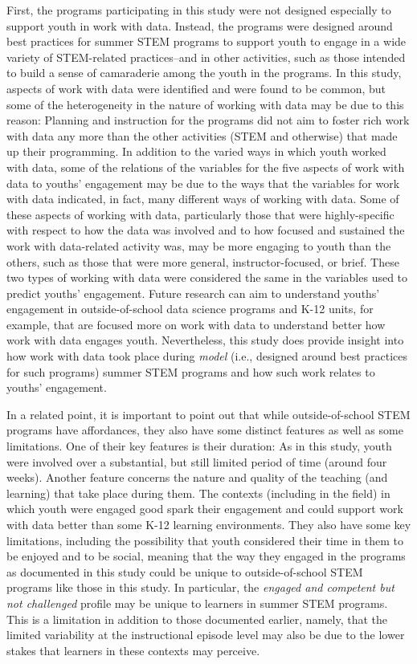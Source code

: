 \documentclass[]{msu-thesis}
\theoremstyle{definition}
\theoremstyle{definition}
\theoremstyle{definition}
\theoremstyle{remark}
\begin{document}
First, the programs participating in this study were not designed
especially to support youth in work with data. Instead, the programs
were designed around best practices for summer STEM programs to support
youth to engage in a wide variety of STEM-related practices--and in
other activities, such as those intended to build a sense of camaraderie
among the youth in the programs. In this study, aspects of work with
data were identified and were found to be common, but some of the
heterogeneity in the nature of working with data may be due to this
reason: Planning and instruction for the programs did not aim to foster
rich work with data any more than the other activities (STEM and
otherwise) that made up their programming. In addition to the varied
ways in which youth worked with data, some of the relations of the
variables for the five aspects of work with data to youths' engagement
may be due to the ways that the variables for work with data indicated,
in fact, many different ways of working with data. Some of these aspects
of working with data, particularly those that were highly-specific with
respect to how the data was involved and to how focused and sustained
the work with data-related activity was, may be more engaging to youth
than the others, such as those that were more general,
instructor-focused, or brief. These two types of working with data were
considered the same in the variables used to predict youths' engagement.
Future research can aim to understand youths' engagement in
outside-of-school data science programs and K-12 units, for example,
that are focused more on work with data to understand better how work
with data engages youth. Nevertheless, this study does provide insight
into how work with data took place during \emph{model} (i.e., designed
around best practices for such programs) summer STEM programs and how
such work relates to youths' engagement.

In a related point, it is important to point out that while
outside-of-school STEM programs have affordances, they also have some
distinct features as well as some limitations. One of their key features
is their duration: As in this study, youth were involved over a
substantial, but still limited period of time (around four weeks).
Another feature concerns the nature and quality of the teaching (and
learning) that take place during them. The contexts (including in the
field) in which youth were engaged good spark their engagement and could
support work with data better than some K-12 learning environments. They
also have some key limitations, including the possibility that youth
considered their time in them to be enjoyed and to be social, meaning
that the way they engaged in the programs as documented in this study
could be unique to outside-of-school STEM programs like those in this
study. In particular, the \emph{engaged and competent but not
challenged} profile may be unique to learners in summer STEM programs.
This is a limitation in addition to those documented earlier, namely,
that the limited variability at the instructional episode level may also
be due to the lower stakes that learners in these contexts may perceive.
\end{document}
